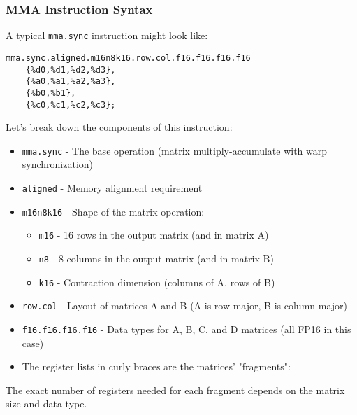 \subsubsection{MMA Instruction Syntax}

A typical \texttt{mma.sync} instruction might look like:

\begin{lstlisting}[style=ptx]
mma.sync.aligned.m16n8k16.row.col.f16.f16.f16.f16 
    {%d0,%d1,%d2,%d3}, 
    {%a0,%a1,%a2,%a3}, 
    {%b0,%b1}, 
    {%c0,%c1,%c2,%c3};
\end{lstlisting}

Let's break down the components of this instruction:

\begin{itemize}
    \item \texttt{mma.sync} - The base operation (matrix multiply-accumulate with warp synchronization)
    
    \item \texttt{aligned} - Memory alignment requirement
    
    \item \texttt{m16n8k16} - Shape of the matrix operation:
    \begin{itemize}
        \item \texttt{m16} - 16 rows in the output matrix (and in matrix A)
        \item \texttt{n8} - 8 columns in the output matrix (and in matrix B)
        \item \texttt{k16} - Contraction dimension (columns of A, rows of B)
    \end{itemize}
    
    \item \texttt{row.col} - Layout of matrices A and B (A is row-major, B is column-major)
    
    \item \texttt{f16.f16.f16.f16} - Data types for A, B, C, and D matrices (all FP16 in this case)
    
    \item The register lists in curly braces are the matrices' "fragments":
    \begin{itemize}
        \item \texttt{\{%
        \item \texttt{\{%
        \item \texttt{\{%
        \item \texttt{\{%
    \end{itemize}
\end{itemize}

The exact number of registers needed for each fragment depends on the matrix size and data type.

